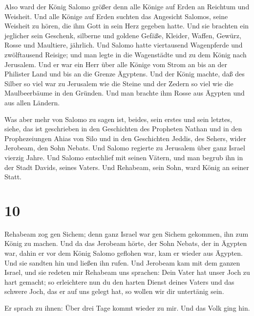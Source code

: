  Also ward der König Salomo größer denn alle Könige auf
Erden an Reichtum und Weisheit.  Und alle Könige auf Erden
suchten das Angesicht Salomos, seine Weisheit zu hören, die ihm Gott in
sein Herz gegeben hatte.  Und sie brachten ein jeglicher
sein Geschenk, silberne und goldene Gefäße, Kleider, Waffen, Gewürz,
Rosse und Maultiere, jährlich.  Und Salomo hatte
viertausend Wagenpferde und zwölftausend Reisige; und man legte in die
Wagenstädte und zu dem König nach Jerusalem.  Und er war
ein Herr über alle Könige vom Strom an bis an der Philister Land und bis
an die Grenze Ägyptens.  Und der König machte, daß des
Silber so viel war zu Jerusalem wie die Steine und der Zedern so viel
wie die Maulbeerbäume in den Gründen.  Und man brachte ihm
Rosse aus Ägypten und aus allen Ländern.

 Was aber mehr von Salomo zu sagen ist, beides, sein erstes
und sein letztes, siehe, das ist geschrieben in den Geschichten des
Propheten Nathan und in den Prophezeiungen Ahias von Silo und in den
Geschichten Jeddis, des Sehers, wider Jerobeam, den Sohn Nebats.
 Und Salomo regierte zu Jerusalem über ganz Israel vierzig
Jahre.  Und Salomo entschlief mit seinen Vätern, und man
begrub ihn in der Stadt Davids, seines Vaters. Und Rehabeam, sein Sohn,
ward König an seiner Statt.

\hypertarget{section-9}{%
\section{10}\label{section-9}}

 Rehabeam zog gen Sichem; denn ganz Israel war gen Sichem
gekommen, ihn zum König zu machen.  Und da das Jerobeam
hörte, der Sohn Nebats, der in Ägypten war, dahin er vor dem König
Salomo geflohen war, kam er wieder aus Ägypten.  Und sie
sandten hin und ließen ihn rufen. Und Jerobeam kam mit dem ganzen
Israel, und sie redeten mir Rehabeam uns sprachen:  Dein
Vater hat unser Joch zu hart gemacht; so erleichtere nun du den harten
Dienst deines Vaters und das schwere Joch, das er auf uns gelegt hat, so
wollen wir dir untertänig sein.

 Er sprach zu ihnen: Über drei Tage kommt wieder zu mir. Und
das Volk ging hin.

